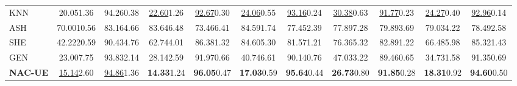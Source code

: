 \documentclass{article} \usepackage{iclr2024_conference,times}
\begin{document}
\begin{table*}
{\begin{tabular}{l cc cc cc cc cc}
			KNN & 20.05{\tiny1.36} & 94.26{\tiny0.38} & \underline{22.60}{\tiny1.26} & \underline{92.67}{\tiny0.30} & \underline{24.06}{\tiny0.55} & \underline{93.16}{\tiny0.24} & \underline{30.38}{\tiny0.63} & \underline{91.77}{\tiny0.23} & \underline{24.27}{\tiny0.40} & \underline{92.96}{\tiny0.14} \\ 
ASH & 70.00{\tiny10.56} & 83.16{\tiny4.66} & 83.64{\tiny6.48} & 73.46{\tiny6.41} & 84.59{\tiny1.74} & 77.45{\tiny2.39} & 77.89{\tiny7.28} & 79.89{\tiny3.69} & 79.03{\tiny4.22} & 78.49{\tiny2.58} \\ 
			SHE & 42.22{\tiny20.59} & 90.43{\tiny4.76} & 62.74{\tiny4.01} & 86.38{\tiny1.32} & 84.60{\tiny5.30} & 81.57{\tiny1.21} & 76.36{\tiny5.32} & 82.89{\tiny1.22} & 66.48{\tiny5.98} & 85.32{\tiny1.43} \\ 
			GEN & 23.00{\tiny7.75} & 93.83{\tiny2.14} & 28.14{\tiny2.59} & 91.97{\tiny0.66} & 40.74{\tiny6.61} & 90.14{\tiny0.76} & 47.03{\tiny3.22} & 89.46{\tiny0.65} & 34.73{\tiny1.58} & 91.35{\tiny0.69} \\ 
			\rowcolor{LightGray}
			\textbf{NAC-UE} & \underline{15.14}{\tiny2.60}  & \underline{94.86}{\tiny1.36}  & \textbf{14.33}{\tiny1.24}  & \textbf{96.05}{\tiny0.47}  & \textbf{17.03}{\tiny0.59}  & \textbf{95.64}{\tiny0.44}  & \textbf{26.73}{\tiny0.80}  &  \textbf{91.85}{\tiny0.28}  & \textbf{18.31}{\tiny0.92} &  \textbf{94.60}{\tiny0.50} \\ 
			\midrule
			

\end{tabular}}
\end{table*}
\end{document}
